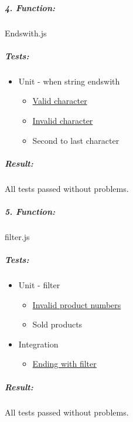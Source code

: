 \documentclass[a4paper, 12pt]{article}
\begin{document}
		
		
		\hypertarget{header-n358}{%
		\subparagraph{4. Function:}\label{header-n358}}
		
		Endswith.js
		
		\hypertarget{header-n101}{%
		\subparagraph{Tests:}\label{header-n101}}
		
		\begin{itemize}
		\item
		Unit - when string endswith
		
		\begin{itemize}
			\item
			\underline{Valid character}
			\item
			\underline{Invalid character}
			\item
			Second to last character
		\end{itemize}
		\end{itemize}
		
		\hypertarget{header-n114}{%
		\subparagraph{\texorpdfstring{Result: }{Result: }}\label{header-n114}}
		
		All tests passed without problems.
		
		
		
		
		\hypertarget{header-n148}{%
		\subparagraph{5. Function:}\label{header-n148}}
		
		filter.js
		
		\hypertarget{header-n150}{%
		\subparagraph{Tests:}\label{header-n150}}
		
		\begin{itemize}
		\item
		Unit - filter
		
		\begin{itemize}
			\item
			\underline{Invalid product numbers}
			\item
			Sold products
		\end{itemize}
		\item
		Integration
		
		\begin{itemize}
			\item
			\underline{Ending with filter}
		\end{itemize}
		\end{itemize}
		
		\hypertarget{header-n168}{%
		\subparagraph{Result:}\label{header-n168}}
		
		All tests passed without problems.
\end{document}
